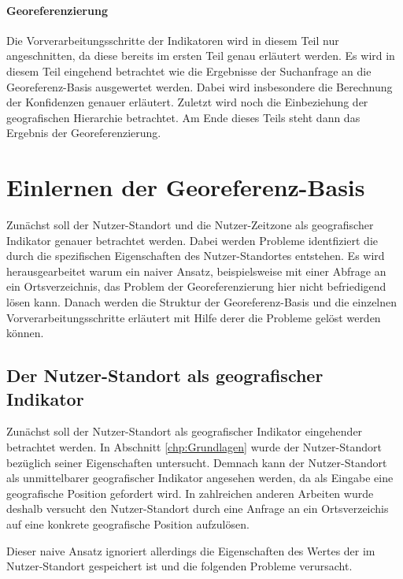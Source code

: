 	\paragraph{Georeferenzierung} 
	Die Vorverarbeitungsschritte der Indikatoren wird in diesem Teil nur angeschnitten, da diese bereits im ersten Teil genau erläutert werden. 
	Es wird in diesem Teil eingehend betrachtet wie die Ergebnisse der Suchanfrage an die Georeferenz-Basis ausgewertet werden. 
	Dabei wird insbesondere die Berechnung der Konfidenzen genauer erläutert.
	Zuletzt wird noch die Einbeziehung der geografischen Hierarchie betrachtet. 
	Am Ende dieses Teils steht dann das Ergebnis der Georeferenzierung. 


	\section{Einlernen der Georeferenz-Basis}
	Zunächst soll der Nutzer-Standort und die Nutzer-Zeitzone als geografischer Indikator genauer betrachtet werden. 
	Dabei werden Probleme identfiziert die durch die spezifischen Eigenschaften des Nutzer-Standortes entstehen.
	Es wird herausgearbeitet warum ein naiver Ansatz, beispielsweise mit einer Abfrage an ein Ortsverzeichnis, das Problem der Georeferenzierung hier nicht befriedigend lösen kann.  
	Danach werden die Struktur der Georeferenz-Basis und die einzelnen Vorverarbeitungsschritte erläutert mit Hilfe derer die Probleme gelöst werden können.  
			\subsection{Der Nutzer-Standort als geografischer Indikator} \label{subsec:ulAsgeogInd} 

			Zunächst soll der Nutzer-Standort als geografischer Indikator eingehender betrachtet werden. 
			In Abschnitt \ref{chp:Grundlagen} wurde der Nutzer-Standort bezüglich seiner Eigenschaften untersucht. 
			Demnach kann der Nutzer-Standort als unmittelbarer geografischer Indikator angesehen werden, da als Eingabe eine geografische Position gefordert wird.  
			In zahlreichen anderen Arbeiten wurde deshalb versucht den Nutzer-Standort  durch eine Anfrage an ein Ortsverzeichis auf eine konkrete geografische Position aufzulösen.

			Dieser naive Ansatz ignoriert allerdings die Eigenschaften des Wertes der im Nutzer-Standort gespeichert ist und die folgenden Probleme verursacht.

